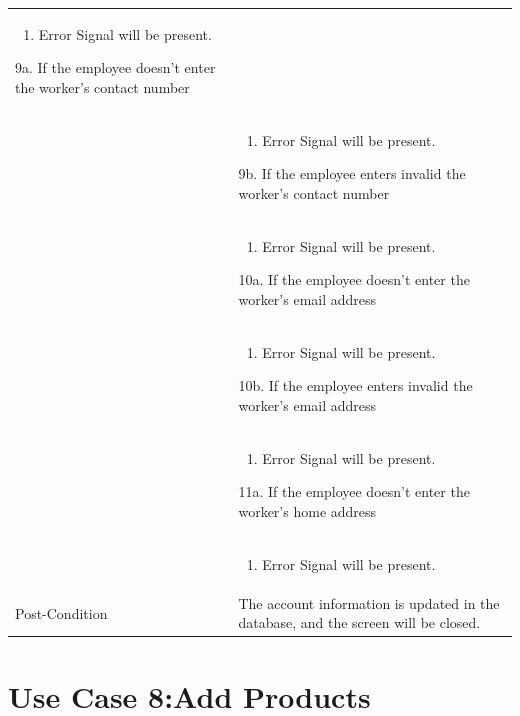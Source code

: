\documentclass[12pt,a4paper]{article}
\begin{document}
\begin{longtable}{| p{3cm}|p{12cm}|}
\begin{enumerate}
		\item Error Signal will be present.
	\end{enumerate}
9a. If the employee doesn't enter the worker's contact number\\ 	
&	\begin{enumerate}
		\item Error Signal will be present.
	\end{enumerate}
9b. If the employee enters invalid the worker's contact number\\ 	
&	\begin{enumerate}
		\item Error Signal will be present.
	\end{enumerate}
10a. If the employee doesn't enter the worker's email address\\ 	
&	\begin{enumerate}
		\item Error Signal will be present.
	\end{enumerate}
10b. If the employee enters invalid the worker's email address\\ 	
&	\begin{enumerate}
		\item Error Signal will be present.
	\end{enumerate}
11a. If the employee doesn't enter the worker's home address\\ 	
&	\begin{enumerate}
		\item Error Signal will be present.
	\end{enumerate}
\\ \hline
Post-Condition & The account information is updated in the database, and the screen will be closed.\\\hline
\end{longtable}
\section*{Use Case 8:Add Products}
\end{document}
